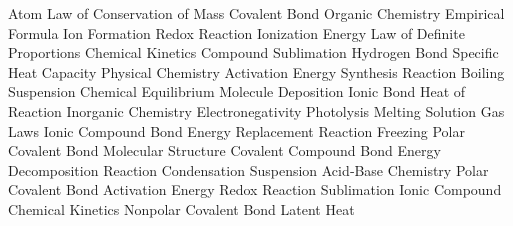 \answerkey
{} Atom
 Law of Conservation of Mass
 Covalent Bond
 Organic Chemistry
 Empirical Formula
 Ion Formation
 Redox Reaction
 Ionization Energy
 Law of Definite Proportions
 Chemical Kinetics
 Compound
 Sublimation
 Hydrogen Bond
 Specific Heat Capacity
 Physical Chemistry
 Activation Energy
 Synthesis Reaction
 Boiling
 Suspension
 Chemical Equilibrium
 Molecule
 Deposition
 Ionic Bond
 Heat of Reaction
 Inorganic Chemistry
 Electronegativity
 Photolysis
 Melting
 Solution
 Gas Laws
 Ionic Compound
 Bond Energy
 Replacement Reaction
 Freezing
 Polar Covalent Bond
 Molecular Structure
 Covalent Compound
 Bond Energy
 Decomposition Reaction
 Condensation
 Suspension
 Acid‑Base Chemistry
 Polar Covalent Bond
 Activation Energy
 Redox Reaction
 Sublimation
 Ionic Compound
 Chemical Kinetics
 Nonpolar Covalent Bond
 Latent Heat
\endanswerkey